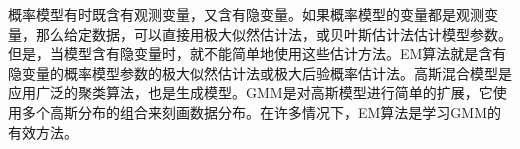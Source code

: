 
\acknowledgement
{}

概率模型有时既含有观测变量，又含有隐变量。如果概率模型的变量都是观测变量，那么给定数据，可以直接用极大似然估计法，或贝叶斯估计法估计模型参数。但是，当模型含有隐变量时，就不能简单地使用这些估计方法。EM算法就是含有隐变量的概率模型参数的极大似然估计法或极大后验概率估计法。高斯混合模型是应用广泛的聚类算法，也是生成模型。GMM是对高斯模型进行简单的扩展，它使用多个高斯分布的组合来刻画数据分布。在许多情况下，EM算法是学习GMM的有效方法。

















